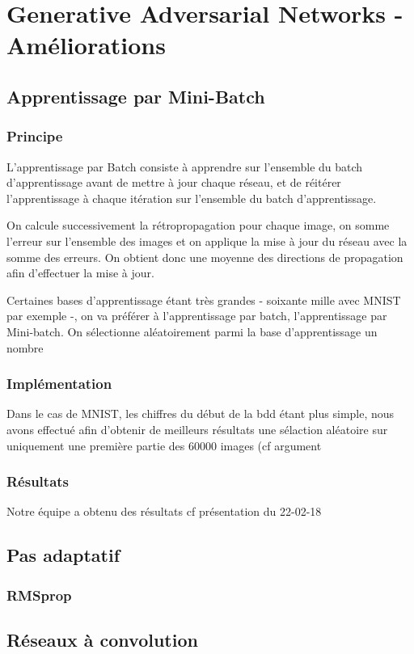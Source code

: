 \chapter{Generative Adversarial Networks - Améliorations}


\section{Apprentissage par Mini-Batch}
\subsection{Principe}
L'apprentissage par Batch consiste à apprendre sur l'ensemble du batch d'apprentissage avant de mettre à jour chaque réseau, et de réitérer l'apprentissage à chaque itération sur l'ensemble du batch d'apprentissage.

On calcule successivement la rétropropagation pour chaque image, on somme l'erreur sur l'ensemble des images et on applique la mise à jour du réseau avec la somme des erreurs. On obtient donc une moyenne des directions de propagation afin d'effectuer la mise à jour.

Certaines bases d'apprentissage étant très grandes - soixante mille avec MNIST par exemple -, on va préférer à l'apprentissage par batch, l'apprentissage par Mini-batch. 
On sélectionne aléatoirement parmi la base d'apprentissage un nombre 
\subsection{Implémentation}
Dans le cas de MNIST, les chiffres du début de la bdd étant plus simple, nous avons effectué afin d'obtenir de meilleurs résultats une sélaction aléatoire sur uniquement une première partie des 60000 images (cf argument 
\subsection{Résultats}
Notre équipe a obtenu des résultats 
cf présentation du 22-02-18

\section{Pas adaptatif}
\subsection{RMSprop}

\section{Réseaux à convolution}




